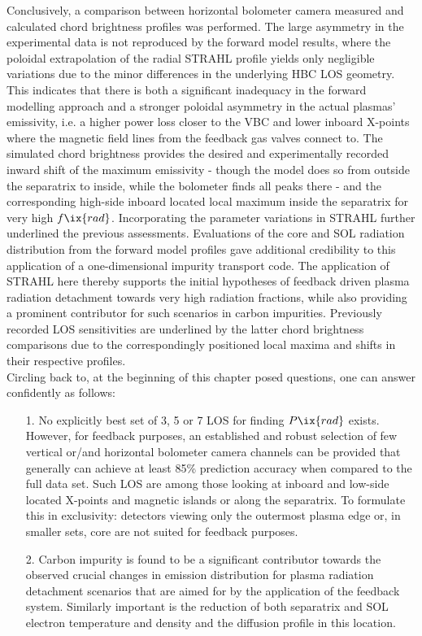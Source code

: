         Conclusively, a comparison between horizontal bolometer camera measured and calculated chord brightness profiles was performed. The large asymmetry in the experimental data is not reproduced by the forward model results, where the poloidal extrapolation of the radial STRAHL profile yields only negligible variations due to the minor differences in the underlying HBC LOS geometry. This indicates that there is both a significant inadequacy in the forward modelling approach and a stronger poloidal asymmetry in the actual plasmas' emissivity, i.e. a higher power loss closer to the VBC and lower inboard X-points where the magnetic field lines from the feedback gas valves connect to. The simulated chord brightness provides the desired and experimentally recorded inward shift of the maximum emissivity - though the model does so from outside the separatrix to inside, while the bolometer finds all peaks there - and the corresponding high-side inboard located local maximum inside the separatrix for very high $f\ix{rad}$. Incorporating the parameter variations in STRAHL further underlined the previous assessments. Evaluations of the core and SOL radiation distribution from the forward model profiles gave additional credibility to this application of a one-dimensional impurity transport code. The application of STRAHL here thereby supports the initial hypotheses of feedback driven plasma radiation detachment towards very high radiation fractions, while also providing a prominent contributor for such scenarios in carbon impurities. Previously recorded LOS sensitivities are underlined by the latter chord brightness comparisons due to the correspondingly positioned local maxima and shifts in their respective profiles.\\%
        Circling back to, at the beginning of this chapter posed questions, one can answer confidently as follows:%
%
    \begin{enumerate}%
        \item[1.]{%
            No explicitly best set of 3, 5 or 7 LOS for finding $P\ix{rad}$ exists. However, for feedback purposes, an established and robust selection of few vertical or/and horizontal bolometer camera channels can be provided that generally can achieve at least 85\% prediction accuracy when compared to the full data set. Such LOS are among those looking at inboard and low-side located X-points and magnetic islands or along the separatrix. To formulate this in exclusivity: detectors viewing only the outermost plasma edge or, in smaller sets, core are not suited for feedback purposes.}%
        \item[2.]{%
            Carbon impurity is found to be a significant contributor towards the observed crucial changes in emission distribution for plasma radiation detachment scenarios that are aimed for by the application of the feedback system. Similarly important is the reduction of both separatrix and SOL electron temperature and density and the diffusion profile in this location.}%
    \end{enumerate}%